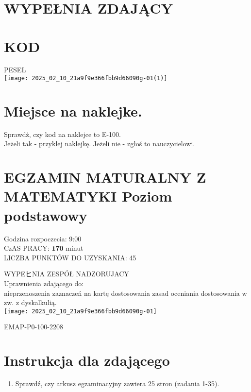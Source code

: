 \documentclass[10pt]{article}
\author{Data: 23 sierpnia 2022 r.}
\date{}
\begin{document}
\maketitle
\section*{WYPEŁNIA ZDAJĄCY}
\section*{KOD}
PESEL\\
\texttt{[image: 2025\_02\_10\_21a9f9e366fbb9d66090g-01(1)]}

\section*{Miejsce na naklejke.}
Sprawdż, czy kod na naklejce to E-100.\\
Jeżeli tak - przyklej naklejkę. Jeżeli nie - zgłoś to nauczycielowi.

\section*{EGZAMIN MATURALNY Z MATEMATYKI Poziom podstawowy}
Godzina rozpoczecia: 9:00\\
CzAS PRACY: \(\mathbf{1 7 0}\) minut\\
LICZBA PUNKTÓW DO UZYSKANIA: 45

WYPEヒNIA ZESPÓŁ NADZORUJACY\\
Uprawnienia zdającego do:\\
nieprzenoszenia zaznaczeń na kartę dostosowania zasad oceniania dostosowania w zw. z dyskalkulią.\\
\texttt{[image: 2025\_02\_10\_21a9f9e366fbb9d66090g-01]}

EMAP-P0-100-2208

\section*{Instrukcja dla zdającego}
\begin{enumerate}
  \item Sprawdź, czy arkusz egzaminacyjny zawiera 25 stron (zadania 1-35).
\end{enumerate}
\end{document}
